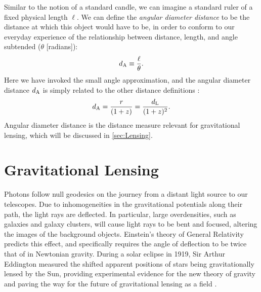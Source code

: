 Similar to the notion of a standard candle, we can imagine a standard ruler of a fixed physical length $\ell$. We can define the {\it angular diameter distance} to be the distance at which this object would have to be, in order to conform to our everyday experience of the relationship between distance, length, and angle subtended ($\theta$ [radians]):
\begin{equation}
d_{\rm A} \equiv \frac{\ell}{\theta}.
\end{equation}
Here we have invoked the small angle approximation, and the angular diameter distance $d_{\rm A}$ is simply related to the other distance definitions \citep{RydenText}:
\begin{equation}
d_{\rm A} = \frac{r}{(1+z)}= \frac{d_{\rm L}}{(1+z)^2}.
\end{equation}
Angular diameter distance is the distance measure relevant for gravitational lensing, which will be discussed in \autoref{sec:Lensing}.

\section{Gravitational Lensing}
\label{sec:Lensing}

Photons follow null geodesics on the journey from a distant light source to our telescopes. Due to inhomogeneities in the gravitational potentials along their path, the light rays are deflected. In particular, large overdensities, such as galaxies and galaxy clusters, will cause light rays to be bent and focused, altering the images of the background objects. Einstein's theory of General Relativity predicts this effect, and specifically requires the angle of deflection to be twice that of in Newtonian gravity. During a solar eclipse in 1919, Sir Arthur Eddington measured the shifted apparent positions of stars being gravitationally lensed by the Sun, providing experimental evidence for the new theory of gravity and paving the way for the future of gravitational lensing as a field \citep[e.g.][]{Blandford92,NarayanBartelmann96,BS01,Schneider06_WeakGravLens}.

